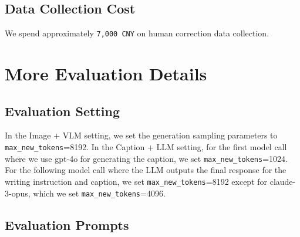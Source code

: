 \subsection{Data Collection Cost}
We spend approximately \texttt{7,000 CNY} on human correction data collection.

\section{More Evaluation Details}
\label{sec:setup}


\subsection{Evaluation Setting}
In the Image + VLM setting, we set the generation sampling parameters to  \texttt{max\_new\_tokens}=8192. In the Caption + LLM setting, for the first model call where we use gpt-4o for generating the caption, we set \texttt{max\_new\_tokens}=1024. For the following model call where the LLM outputs the final response for the writing instruction and caption, we set \texttt{max\_new\_tokens}=8192 except for claude-3-opus, which we set \texttt{max\_new\_tokens}=4096.

\subsection{Evaluation Prompts}


